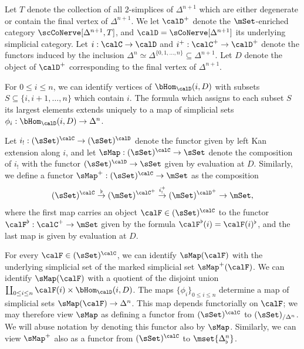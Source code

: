 \begin{notation}
Let $T$ denote the collection of all $2$-simplices of $\Delta^{n+1}$ which are either degenerate or contain the final vertex of $\Delta^{n+1}$. We let $\calD^{+}$ denote the $\mSet$-enriched category
$\scCoNerve[ \Delta^{n+1}, T]$, and $\calD = \sCoNerve[ \Delta^{n+1} ]$ its underlying simplicial category. Let $i: \calC \rightarrow \calD$ and $i^{+}: \calC^{+} \rightarrow \calD^{+}$ denote the functors induced by the inclusion $\Delta^{n} \simeq \Delta^{ \{0, 1, \ldots, n \} } \subseteq \Delta^{n+1}$.
Let $D$ denote the object of $\calD^{+}$ corresponding to the final vertex of $\Delta^{n+1}$.

For $0 \leq i \leq n$, we can identify vertices of $\bHom_{\calD}(i, D)$ with
subsets $S \subseteq \{ i, i+1, \ldots, n \}$ which contain $i$. The formula
which assigns to each subset $S$ its largest elements extends uniquely to a map
of simplicial sets $\phi_i: \bHom_{\calD}(i, D) \rightarrow \Delta^n$.

Let $i_{!}: (\sSet)^{\calC} \rightarrow (\sSet)^{\calD}$ denote the functor given by left Kan extension along $i$, and let $\sMap: (\sSet)^{\calC} \rightarrow \sSet$ denote the composition of $i_{!}$ with the functor
$(\sSet)^{\calD} \rightarrow \sSet$ given by evaluation at $D$. Similarly, we define a functor
$\sMap^{+}: (\sSet)^{\calC} \rightarrow \mSet$ as the composition
$$ (\sSet)^{\calC} \stackrel{\flat}{\rightarrow} (\mSet)^{\calC^{+} }
\stackrel{ i^{+}_{!} }{\rightarrow} (\mSet)^{\calD^{+}} \rightarrow \mSet,$$
where the first map carries an object $\calF \in (\sSet)^{\calC}$ to the functor
$\calF^{\flat}: \calC^{+} \rightarrow \mSet$ given by the formula
$\calF^{\flat}(i) = \calF(i)^{\flat}$, and the last map is given by evaluation at $D$.

For every $\calF \in (\sSet)^{\calC}$, we can identify $\sMap(\calF)$ with the underlying simplicial set of the marked simplicial set $\sMap^{+}(\calF)$. We can identify $\sMap(\calF)$ with a quotient of the
disjoint union $\coprod_{ 0 \leq i \leq n} \calF(i) \times \bHom_{\calD}(i,D)$. The maps
$\{ \phi_i \}_{0 \leq i \leq n}$ determine a map of simplicial sets
$\sMap(\calF) \rightarrow \Delta^n$. This map depends functorially
on $\calF$; we may therefore view $\sMap$ as defining a functor from
$(\sSet)^{\calC}$ to $(\sSet)_{/ \Delta^n}$. We will abuse notation by denoting this functor also by $\sMap$. Similarly, we can view $\sMap^{+}$ also as a functor from
$(\sSet)^{\calC}$ to $\mset{ \Delta^n_{\flat} }$. 
\end{notation}

